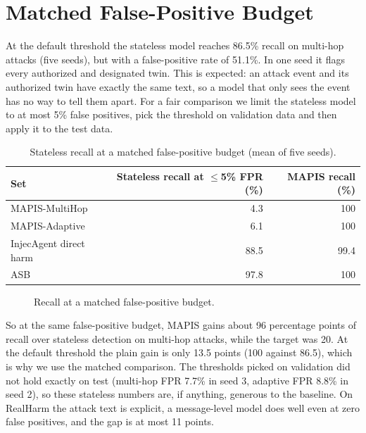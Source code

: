 \section{Matched False-Positive Budget}
At the default threshold the stateless model reaches 86.5\% recall on multi-hop attacks (five seeds), but with a false-positive rate of 51.1\%. In one seed it flags every authorized and designated twin. This is expected: an attack event and its authorized twin have exactly the same text, so a model that only sees the event has no way to tell them apart. For a fair comparison we limit the stateless model to at most 5\% false positives, pick the threshold on validation data and then apply it to the test data.
\begin{table}[H]
\centering\small
\begin{tabular}{lrr}
\toprule
Set & Stateless recall at $\le$5\% FPR (\%) & MAPIS recall (\%)\\
\midrule
MAPIS-MultiHop & 4.3 & 100\\
MAPIS-Adaptive & 6.1 & 100\\
InjecAgent direct harm & 88.5 & 99.4\\
ASB & 97.8 & 100\\
\bottomrule
\end{tabular}
\caption{Stateless recall at a matched false-positive budget (mean of five seeds).}
\end{table}
\begin{figure}[H]
\centering
{}
\caption{Recall at a matched false-positive budget.}
\end{figure}
So at the same false-positive budget, MAPIS gains about 96 percentage points of recall over stateless detection on multi-hop attacks, while the target was 20. At the default threshold the plain gain is only 13.5 points (100 against 86.5), which is why we use the matched comparison. The thresholds picked on validation did not hold exactly on test (multi-hop FPR 7.7\% in seed 3, adaptive FPR 8.8\% in seed 2), so these stateless numbers are, if anything, generous to the baseline. On RealHarm the attack text is explicit, a message-level model does well even at zero false positives, and the gap is at most 11 points.

